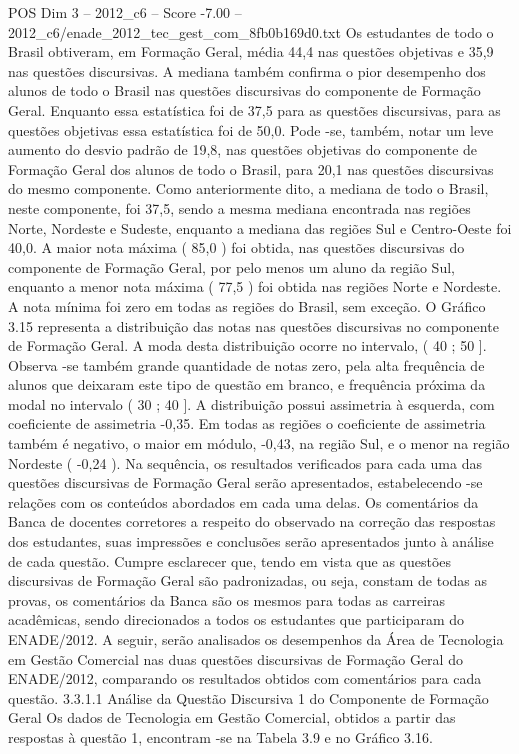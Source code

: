 \begin{textsample}{POS Dim 3 – 2012\_c6 – Score -7.00 – 2012\_c6/enade\_2012\_tec\_gest\_com\_8fb0b169d0.txt}
Os estudantes de todo o Brasil obtiveram, em Formação Geral, média 44,4 nas questões objetivas e 35,9 nas questões discursivas.
A mediana também confirma o pior desempenho dos alunos de todo o Brasil nas questões discursivas do componente de Formação Geral.
Enquanto essa estatística foi de 37,5 para as questões discursivas, para as questões objetivas essa estatística foi de 50,0.
Pode -se, também, notar um leve aumento do desvio padrão de 19,8, nas questões objetivas do componente de Formação Geral dos alunos de todo o Brasil, para 20,1 nas questões discursivas do mesmo componente.
Como anteriormente dito, a mediana de todo o Brasil, neste componente, foi 37,5, sendo a mesma mediana encontrada nas regiões Norte, Nordeste e Sudeste, enquanto a mediana das regiões Sul e Centro-Oeste foi 40,0.
A maior nota máxima ( 85,0 ) foi obtida, nas questões discursivas do componente de Formação Geral, por pelo menos um aluno da região Sul, enquanto a menor nota máxima ( 77,5 ) foi obtida nas regiões Norte e Nordeste.
A nota mínima foi zero em todas as regiões do Brasil, sem exceção.
O Gráfico 3.15 representa a distribuição das notas nas questões discursivas no componente de Formação Geral.
A moda desta distribuição ocorre no intervalo, ( 40 ; 50 ].
Observa -se também grande quantidade de notas zero, pela alta frequência de alunos que deixaram este tipo de questão em branco, e frequência próxima da modal no intervalo ( 30 ; 40 ].
A distribuição possui assimetria à esquerda, com coeficiente de assimetria -0,35.
Em todas as regiões o coeficiente de assimetria também é negativo, o maior em módulo, -0,43, na região Sul, e o menor na região Nordeste ( -0,24 ).
Na sequência, os resultados verificados para cada uma das questões discursivas de Formação Geral serão apresentados, estabelecendo -se relações com os conteúdos abordados em cada uma delas.
Os comentários da Banca de docentes corretores a respeito do observado na correção das respostas dos estudantes, suas impressões e conclusões serão apresentados junto à análise de cada questão.
Cumpre esclarecer que, tendo em vista que as questões discursivas de Formação Geral são padronizadas, ou seja, constam de todas as provas, os comentários da Banca são os mesmos para todas as carreiras acadêmicas, sendo direcionados a todos os estudantes que participaram do ENADE/2012.
A seguir, serão analisados os desempenhos da Área de Tecnologia em Gestão Comercial nas duas questões discursivas de Formação Geral do ENADE/2012, comparando os resultados obtidos com comentários para cada questão. 3.3.1.1 Análise da Questão Discursiva 1 do Componente de Formação Geral Os dados de Tecnologia em Gestão Comercial, obtidos a partir das respostas à questão 1, encontram -se na Tabela 3.9 e no Gráfico 3.16.

\end{textsample}
